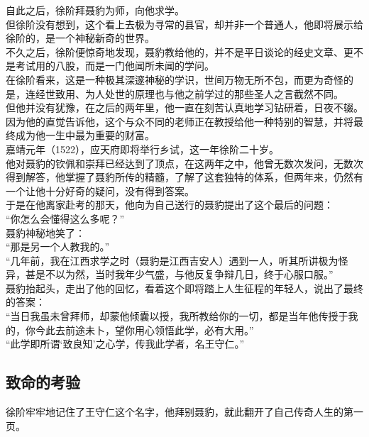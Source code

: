 \begin{multicols}{\theparacolNo}
自此之后，徐阶拜聂豹为师，向他求学。\\

但徐阶没有想到，这个看上去极为寻常的县官，却并非一个普通人，他即将展示给徐阶的，是一个神秘新奇的世界。\\

不久之后，徐阶便惊奇地发现，聂豹教给他的，并不是平日谈论的经史文章、更不是考试用的八股，而是一门他闻所未闻的学问。\\

在徐阶看来，这是一种极其深邃神秘的学识，世间万物无所不包，而更为奇怪的是，连经世致用、为人处世的原理也与他之前学过的那些圣人之言截然不同。\\

但他并没有犹豫，在之后的两年里，他一直在刻苦认真地学习钻研着，日夜不辍。因为他的直觉告诉他，这个与众不同的老师正在教授给他一种特别的智慧，并将最终成为他一生中最为重要的财富。\\

嘉靖元年（1522），应天府即将举行乡试，这一年徐阶二十岁。\\

他对聂豹的钦佩和崇拜已经达到了顶点，在这两年之中，他曾无数次发问，无数次得到解答，他掌握了聂豹所传的精髓，了解了这套独特的体系，但两年来，仍然有一个让他十分好奇的疑问，没有得到答案。\\

于是在他离家赴考的那天，他向为自己送行的聂豹提出了这个最后的问题：\\

“你怎么会懂得这么多呢？”\\

聂豹神秘地笑了：\\

“那是另一个人教我的。”\\

“几年前，我在江西求学之时（聂豹是江西吉安人）遇到一人，听其所讲极为怪异，甚是不以为然，当时我年少气盛，与他反复争辩几日，终于心服口服。”\\

聂豹抬起头，走出了他的回忆，看着这个即将踏上人生征程的年轻人，说出了最终的答案：\\

“当日我虽未曾拜师，却蒙他倾囊以授，我所教给你的一切，都是当年他传授于我的，你今此去前途未卜，望你用心领悟此学，必有大用。”\\

“此学即所谓‘致良知’之心学，传我此学者，名王守仁。”\\

\subsection{致命的考验}
徐阶牢牢地记住了王守仁这个名字，他拜别聂豹，就此翻开了自己传奇人生的第一页。\\


\end{multicols}

